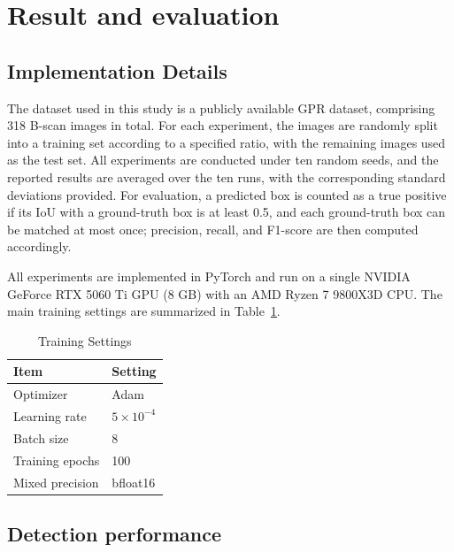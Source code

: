 \documentclass[lettersize,journal]{IEEEtran}
\begin{document}
\section{Result and evaluation}
\subsection{Implementation Details}
\label{sec:impl}
The dataset used in this study is a publicly available GPR dataset, comprising
318 B-scan images in total. For each experiment, the images are randomly split
into a training set according to a specified ratio, with the remaining images
used as the test set. All experiments are conducted under ten random seeds, and
the reported results are averaged over the ten runs, with the corresponding
standard deviations provided. For evaluation, a predicted box is counted as a
true positive if its IoU with a ground-truth box is at least 0.5, and each
ground-truth box can be matched at most once; precision, recall, and F1-score
are then computed accordingly.

All experiments are implemented in PyTorch and run on a single NVIDIA GeForce
RTX 5060 Ti GPU (8 GB) with an AMD Ryzen 7 9800X3D CPU. The main training
settings are summarized in Table~\ref{tab:impl}.

\begin{table}[]
\caption{Training Settings}
\label{tab:impl}
\centering
\begin{tabular}{ll}
\toprule
Item & Setting \\
\midrule
Optimizer & Adam \\
Learning rate & $5\times10^{-4}$ \\
Batch size & 8 \\
Training epochs & 100 \\
Mixed precision & bfloat16 \\
\bottomrule
\end{tabular}
\end{table}

\subsection{Detection performance}
\end{document}
